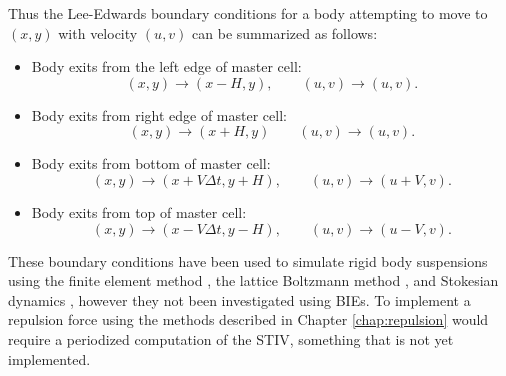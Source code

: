 Thus the Lee-Edwards boundary conditions for a body attempting to move to $(x,y)$ with velocity $(u,v)$ can be summarized as follows:
\begin{itemize}
	\item Body exits from the left edge of master cell:
		\[ (x,y) \rightarrow (x - H, y),\qquad (u,v)\rightarrow (u,v).\]
	\item Body exits from right edge of master cell:
		\[(x,y) \rightarrow (x+H, y) \qquad (u,v)\rightarrow(u,v).\]
	\item Body exits from bottom of master cell:
		\[(x,y) \rightarrow (x + V\Delta t, y + H), \qquad (u,v)\rightarrow (u + V, v).\]
	\item Body exits from top  of master cell:
		\[(x,y) \rightarrow (x - V\Delta t, y - H), \qquad (u,v)\rightarrow (u - V, v).\]	
\end{itemize}
These boundary conditions have been used to simulate rigid body suspensions using the finite element method \cite{Hwang2006}, the lattice Boltzmann method \cite{Lorenz2009}, and Stokesian dynamics \cite{Satoh1998}, however they not been investigated using BIEs.  To implement a repulsion force using the methods described in Chapter \ref{chap:repulsion} would require a periodized computation of the STIV, something that is not yet implemented.
